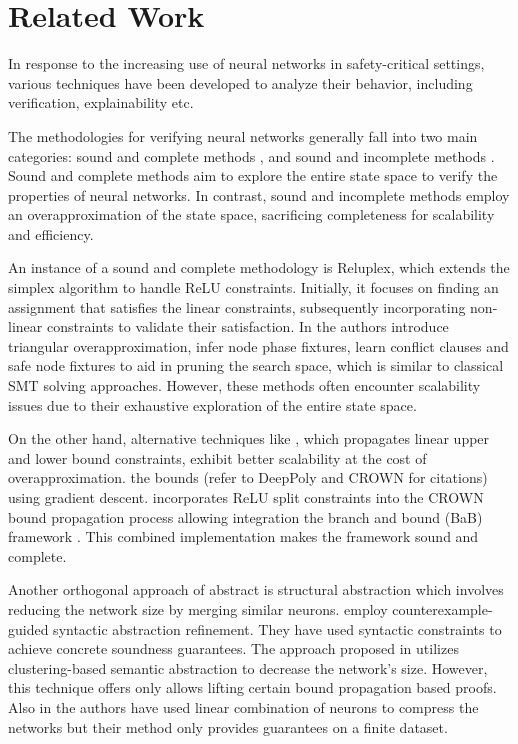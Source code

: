 \section{Related Work}

In response to the increasing use of neural networks in safety-critical settings, 
various techniques have been developed to analyze their behavior, including 
verification, explainability etc. 

The methodologies for verifying neural networks generally fall into two main
categories: sound and complete methods , and sound and
incomplete methods . Sound and complete methods aim to 
explore the entire state space to verify the properties of neural networks.
In contrast, sound and incomplete methods employ an overapproximation
of the state space, sacrificing completeness for 
scalability and efficiency.

An instance of a sound and complete methodology is Reluplex, which extends the 
simplex algorithm  to 
handle ReLU constraints. Initially, it focuses on finding an assignment that 
satisfies the linear constraints, subsequently incorporating non-linear constraints 
to validate their satisfaction. In  
the authors introduce triangular overapproximation, infer node phase fixtures,
learn conflict clauses and safe node fixtures to aid in pruning the search 
space, which is similar to classical SMT solving approaches. However, these methods
often encounter scalability issues due to their exhaustive exploration of the
entire state space. 

On the other hand, alternative techniques like , which
propagates linear upper and lower bound constraints, exhibit better
scalability at the cost of overapproximation.  
 the bounds (refer to DeepPoly and CROWN for citations) 
using gradient descent. 
 incorporates ReLU split
constraints into the CROWN bound propagation process allowing integration
 the branch and bound (BaB) framework . 
This combined implementation makes the \abcrown framework sound and complete.

Another orthogonal approach of abstract is structural abstraction  
which involves reducing the network size by merging similar neurons. 
 employ counterexample-guided syntactic abstraction refinement.
They have used syntactic constraints to achieve concrete soundness guarantees.
The approach proposed in  utilizes clustering-based 
semantic abstraction to decrease the network's size. However, this technique 
offers only allows lifting certain bound propagation
based proofs. Also in \cite{lin-comb-abs-jan} the authors have used linear 
combination of neurons to compress the networks but their method only provides 
guarantees on a finite dataset. 

